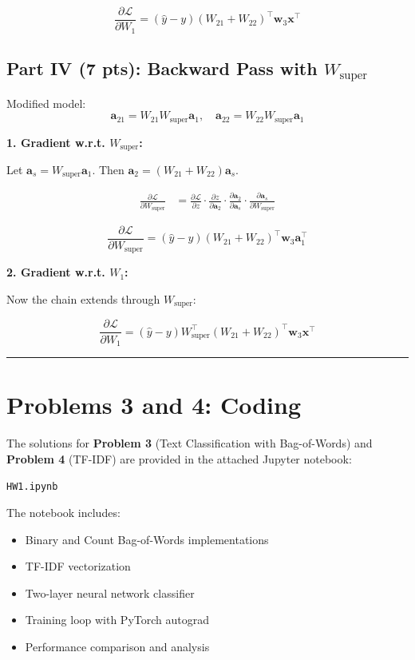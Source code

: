 \documentclass[11pt]{article}
\begin{document}
\[
\boxed{\frac{\partial \mathcal{L}}{\partial W_1} = (\hat{y} - y) (W_{21} + W_{22})^\top \mathbf{w}_3 \mathbf{x}^\top}
\]

\subsection*{Part IV (7 pts): Backward Pass with $W_{\text{super}}$}

Modified model:
\[
\mathbf{a}_{21} = W_{21} W_{\text{super}} \mathbf{a}_1, \quad \mathbf{a}_{22} = W_{22} W_{\text{super}} \mathbf{a}_1
\]

\textbf{1. Gradient w.r.t. $W_{\text{super}}$:}

Let $\mathbf{a}_s = W_{\text{super}} \mathbf{a}_1$. Then $\mathbf{a}_2 = (W_{21} + W_{22}) \mathbf{a}_s$.

\begin{align*}
\frac{\partial \mathcal{L}}{\partial W_{\text{super}}} &= \frac{\partial \mathcal{L}}{\partial z} \cdot \frac{\partial z}{\partial \mathbf{a}_2} \cdot \frac{\partial \mathbf{a}_2}{\partial \mathbf{a}_s} \cdot \frac{\partial \mathbf{a}_s}{\partial W_{\text{super}}}
\end{align*}

\[
\boxed{\frac{\partial \mathcal{L}}{\partial W_{\text{super}}} = (\hat{y} - y) (W_{21} + W_{22})^\top \mathbf{w}_3 \mathbf{a}_1^\top}
\]

\textbf{2. Gradient w.r.t. $W_1$:}

Now the chain extends through $W_{\text{super}}$:

\[
\boxed{\frac{\partial \mathcal{L}}{\partial W_1} = (\hat{y} - y) W_{\text{super}}^\top (W_{21} + W_{22})^\top \mathbf{w}_3 \mathbf{x}^\top}
\]

\vspace{2em}
\hrule
\vspace{1em}

\section*{Problems 3 and 4: Coding}

The solutions for \textbf{Problem 3} (Text Classification with Bag-of-Words) and \textbf{Problem 4} (TF-IDF) are provided in the attached Jupyter notebook:

\begin{center}
\texttt{HW1.ipynb}
\end{center}

The notebook includes:
\begin{itemize}[nosep]
    \item Binary and Count Bag-of-Words implementations
    \item TF-IDF vectorization
    \item Two-layer neural network classifier
    \item Training loop with PyTorch autograd
    \item Performance comparison and analysis
\end{itemize}
\end{document}
